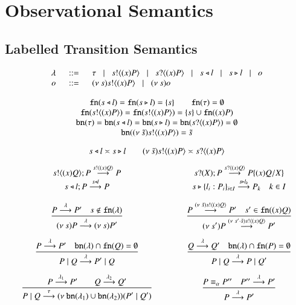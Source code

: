 \section{Observational Semantics}

\subsection{Labelled Transition Semantics}

\[
	\begin{array}{rcl}
		\lambda &\;\;::=\;\;& \tau \;\;\;|\;\;\; s ! \langle (x)P \rangle \;\;\;|\;\;\; s ? \langle (x)P \rangle \;\;\;|\;\;\; s \triangleleft l \;\;\;|\;\;\; s \triangleright l \;\;\;|\;\;\; o\\
		o &\;\;::=\;\;& (\nu\ s) s ! \langle (x)P \rangle \;\;\;|\;\;\; (\nu\ s) o
	\end{array}
\]

\[
	\begin{array}{c}
		\mathtt{fn}(s \triangleleft l) = \mathtt{fn}(s \triangleright l) = \{s\} \qquad \mathtt{fn}(\tau) = \emptyset \\ 
		\mathtt{fn}(s ! \langle (x)P \rangle) = \mathtt{fn}(s ! \langle (x)P \rangle) = \{s\} \cup \mathtt{fn}((x)P)\\
		\mathtt{bn}(\tau) = \mathtt{bn}(s \triangleleft l) = \mathtt{bn}(s \triangleright l) = \mathtt{bn}(s ? \langle (x)P \rangle) = \emptyset\\
		\mathtt{bn}((\nu\ \tilde{s}) s ! \langle (x)P \rangle) = \tilde{s}
	\end{array}
\]

\[
	s \triangleleft l \asymp s \triangleright l \qquad (\nu\ \tilde{s}) s ! \langle (x)P \rangle \asymp s ? \langle (x)P \rangle
\]


\[
\begin{array}{ccc}
	\bout{s}{\abs{x}{Q}} P \by{\bactout{s}{\abs{x}{Q}}} P
	&\qquad&
	\binp{s}{X} P \by{\bactinp{s}{\abs{x}Q}} P\subst{\abs{x}Q}{X}
	\\

	\bsel{s}{l}{P} \by{\bactsel{s}{l}} P
	&&
	\bbra{s}{l_i:P_i}_{i \in I} \by{\bactbra{s}{l_k}} P_k \quad k \in I
	\\[4mm]

	\tree{
		P \by{\lambda} P' \quad s \notin \fn{\lambda}
	}{
		\news{s} P \by{\lambda} \news{s} P' 
	}
	&&
	\tree{
		P \by{\news{\tilde{s}} \bactout{s}{\abs{x} Q}} P' \quad s' \in \fn{\abs{x} Q}
	}{
		\news{s'} P \by{\news{s'\cat\tilde{s}} \bactout{s}{\abs{x} Q}} P'
	}
	\\[7mm]

	\tree{
		P \by{\lambda} P' \quad \bn{\lambda} \cap \fn{Q} = \es
	}{
		P \Par Q \by{\lambda} P' \Par Q
	}
	&&
	\tree{
		Q \by{\lambda} Q' \quad \bn{\lambda} \cap \fn{P} = \es
	}{
		P \Par Q \by{\lambda} P \Par Q'
	}
	\\[7mm]

	\tree{
		P \by{\lambda_1} P' \qquad Q \by{\lambda_2} Q'
	}{
		P \Par Q \by{\tau} \newsp{\bn{\lambda_1} \cup \bn{\lambda_2}}{P' \Par Q'}
	}
	&&
	\tree{
		P \scong_\alpha P'' \quad P'' \by{\lambda} P'
	}{
		P \by{\lambda} P'
	}
\end{array}
\]

